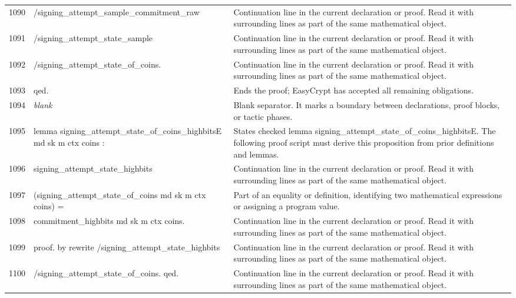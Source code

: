 \documentclass[10pt]{article}
\begin{document}
\begin{longtable}{r L{0.53\textwidth} L{0.37\textwidth}}
1090 & {\ttfamily\scriptsize            /signing\_attempt\_sample\_commitment\_raw} & Continuation line in the current declaration or proof.  Read it with surrounding lines as part of the same mathematical object. \\
1091 & {\ttfamily\scriptsize            /signing\_attempt\_state\_sample} & Continuation line in the current declaration or proof.  Read it with surrounding lines as part of the same mathematical object. \\
1092 & {\ttfamily\scriptsize            /signing\_attempt\_state\_of\_coins.} & Continuation line in the current declaration or proof.  Read it with surrounding lines as part of the same mathematical object. \\
1093 & {\ttfamily\scriptsize qed.} & Ends the proof; EasyCrypt has accepted all remaining obligations. \\
1094 & {\ttfamily\scriptsize \emph{blank}} & Blank separator.  It marks a boundary between declarations, proof blocks, or tactic phases. \\
1095 & {\ttfamily\scriptsize lemma signing\_attempt\_state\_of\_coins\_highbitsE md sk m ctx coins :} & States checked lemma signing\_attempt\_state\_of\_coins\_highbitsE.  The following proof script must derive this proposition from prior definitions and lemmas. \\
1096 & {\ttfamily\scriptsize   signing\_attempt\_state\_highbits} & Continuation line in the current declaration or proof.  Read it with surrounding lines as part of the same mathematical object. \\
1097 & {\ttfamily\scriptsize     (signing\_attempt\_state\_of\_coins md sk m ctx coins) =} & Part of an equality or definition, identifying two mathematical expressions or assigning a program value. \\
1098 & {\ttfamily\scriptsize   commitment\_highbits md sk m ctx coins.} & Continuation line in the current declaration or proof.  Read it with surrounding lines as part of the same mathematical object. \\
1099 & {\ttfamily\scriptsize proof. by rewrite /signing\_attempt\_state\_highbits} & Continuation line in the current declaration or proof.  Read it with surrounding lines as part of the same mathematical object. \\
1100 & {\ttfamily\scriptsize                   /signing\_attempt\_state\_of\_coins. qed.} & Continuation line in the current declaration or proof.  Read it with surrounding lines as part of the same mathematical object. \\

\end{longtable}
\end{document}
